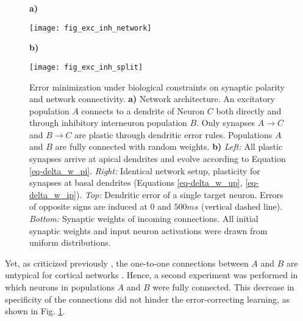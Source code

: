 \begin{figure}[h]
    \centering
    \begin{minipage}{0.2\textwidth}
        \textbf{a)}\par\medskip
        \centering
        \texttt{[image: fig\_exc\_inh\_network]}
    \end{minipage}\hfill
    \begin{minipage}{0.7\textwidth}
        \textbf{b)}\par\medskip
        \centering
        \texttt{[image: fig\_exc\_inh\_split]}
    \end{minipage}
    \caption[Error minimization under biological constraints on synaptic polarity and network connectivity]{Error
        minimization under biological constraints on synaptic polarity and network connectivity. \textbf{a)} Network
        architecture. An excitatory population $A$ connects to a dendrite of Neuron $C$ both directly and through
        inhibitory interneuron population $B$. Only synapses $A\rightarrow C$ and $B \rightarrow C$ are plastic through
        dendritic error rules. Populations $A$ and $B$ are fully connected with random weights. \textbf{b)}
        \textit{Left:} All plastic synapses arrive at apical dendrites and evolve according to Equation
        \ref{eq-delta_w_pi}. \textit{Right:} Identical network setup, plasticity for synapses at basal dendrites
        (Equations \ref{eq-delta_w_up}, \ref{eq-delta_w_ip}). \textit{Top:} Dendritic error of a single target neuron.
        Errors of opposite signs are induced at $0$ and $500ms$ (vertical dashed line). \textit{Bottom:} Synaptic
        weights of incoming connections. All initial synaptic weights and input neuron activations were drawn from
        uniform distributions.}
    \label{fig-exc-inh-split}
\end{figure}

Yet, as criticized previously \citep{whittington2019theories}, the one-to-one connections between $A$ and $B$ are
untypical for cortical networks \citep{douglas2004neuronal,Gordon2010}. Hence, a second experiment was performed in
which neurons in populations $A$ and $B$ were fully connected. This decrease in specificity of the connections did not hinder the
error-correcting learning, as shown in Fig. \ref{fig-exc-inh-split}.

